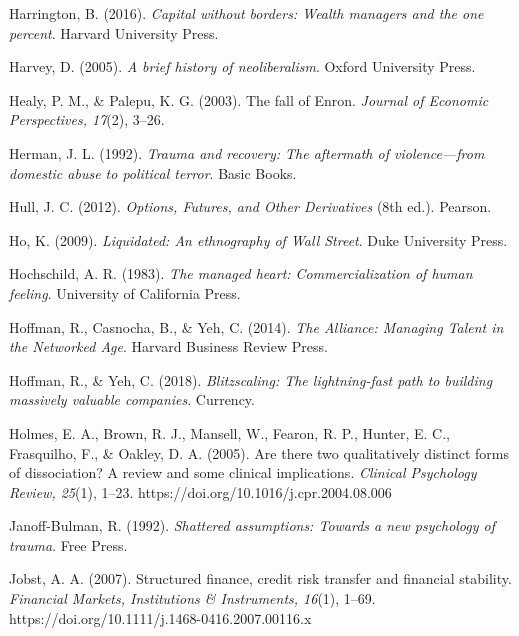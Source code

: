 \begin{thebibliography}{}
    Harrington, B. (2016). \textit{Capital without borders: Wealth managers and the one percent}. Harvard University Press.

    Harvey, D. (2005). \textit{A brief history of neoliberalism}. Oxford University Press.

    Healy, P. M., \& Palepu, K. G. (2003). The fall of Enron. \textit{Journal of Economic Perspectives, 17}(2), 3–26.

    Herman, J. L. (1992). \textit{Trauma and recovery: The aftermath of violence—from domestic abuse to political terror}. Basic Books.

    Hull, J. C. (2012). \textit{Options, Futures, and Other Derivatives} (8th ed.). Pearson.

    Ho, K. (2009). \textit{Liquidated: An ethnography of Wall Street}. Duke University Press.

    Hochschild, A. R. (1983). \textit{The managed heart: Commercialization of human feeling}. University of California Press.

    Hoffman, R., Casnocha, B., \& Yeh, C. (2014). \textit{The Alliance: Managing Talent in the Networked Age}. Harvard Business Review Press.

    Hoffman, R., \& Yeh, C. (2018). \textit{Blitzscaling: The lightning-fast path to building massively valuable companies}. Currency.

    Holmes, E. A., Brown, R. J., Mansell, W., Fearon, R. P., Hunter, E. C., Frasquilho, F., \& Oakley, D. A. (2005). Are there two qualitatively distinct forms of dissociation? A review and some clinical implications. \textit{Clinical Psychology Review, 25}(1), 1–23. https://doi.org/10.1016/j.cpr.2004.08.006



    Janoff-Bulman, R. (1992). \textit{Shattered assumptions: Towards a new psychology of trauma}. Free Press.

    Jobst, A. A. (2007). Structured finance, credit risk transfer and financial stability. \textit{Financial Markets, Institutions \& Instruments, 16}(1), 1–69. https://doi.org/10.1111/j.1468-0416.2007.00116.x


\end{thebibliography}
